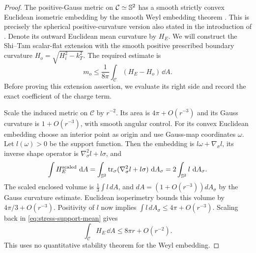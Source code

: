 \begin{proof}
The positive-Gauss metric on $\mathcal C\simeq\mathbb S^2$ has a smooth
strictly convex Euclidean isometric embedding by the smooth Weyl
embedding theorem \citep{Nirenberg1953}.  This is precisely the
spherical positive-curvature version also stated in the introduction
of \citet{ShiTam2002}.  Denote its outward Euclidean mean curvature
by $H_E$.  We will construct the Shi--Tam scalar-flat extension with
the smooth positive prescribed boundary curvature
$H_o=\sqrt{H_i^2-k_T^2}$.  The required estimate is
\begin{equation}
 m_o\le\frac1{8\pi}\int_{\mathcal C}(H_E-H_o)\,\dd A.
 \label{eq:stress-shitam-mass-bound}
\end{equation}
Before proving this extension assertion, we evaluate its right side
and record the exact coefficient of the charge term.

Scale the induced metric on $\mathcal C$ by $r^{-2}$.
Its area is $4\pi+O(r^{-3})$ and its Gauss curvature is
$1+O(r^{-3})$, with smooth angular control.  For its convex Euclidean
embedding choose an interior point as origin and use Gauss-map
coordinates $\omega$.  Let $l(\omega)>0$ be the support function.
Then the embedding is $l\omega+\nabla_\sigma l$, its inverse shape
operator is $\nabla_\sigma^2l+l\sigma$, and
\begin{equation}
 \int H_E^{\mathrm{scaled}}\,\mathop{}\!\mathrm d A
   =\int_{\mathbb S^2}\operatorname{tr}_\sigma(\nabla_\sigma^2l+l\sigma)\,\mathop{}\!\mathrm d A_\sigma
   =2\int_{\mathbb S^2}l\,\mathop{}\!\mathrm d A_\sigma.
 \label{eq:stress-support-mean}
\end{equation}
The scaled enclosed volume is
$\frac13\int l\,dA$, and $dA=(1+O(r^{-3}))dA_\sigma$ by the Gauss
curvature estimate.  Euclidean isoperimetry bounds this volume by
$4\pi/3+O(r^{-3})$.  Positivity of $l$ now implies
$\int l\,dA_\sigma\le4\pi+O(r^{-3})$.  Scaling back in
\eqref{eq:stress-support-mean} gives
\begin{equation}
 \int_{\mathcal C}H_E\,\dd A\le8\pi r+O(r^{-2}).
 \label{eq:stress-Euclidean-H-bound}
\end{equation}
This uses no quantitative stability theorem for the Weyl embedding.


\end{proof}
